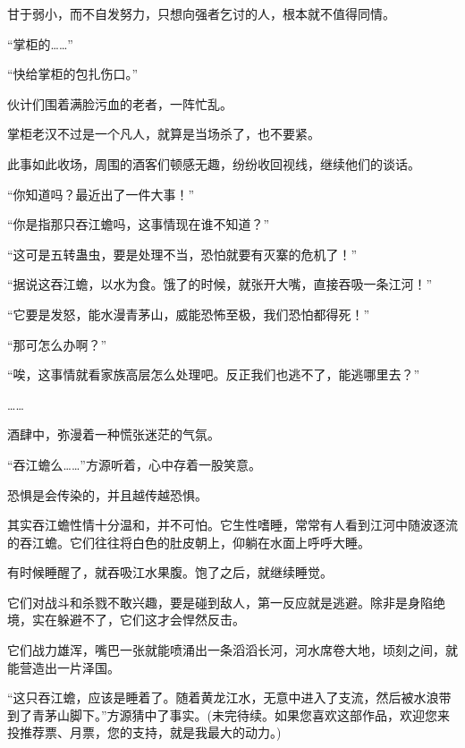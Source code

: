 \begin{this_body}
甘于弱小，而不自发努力，只想向强者乞讨的人，根本就不值得同情。

“掌柜的……”

“快给掌柜的包扎伤口。”

伙计们围着满脸污血的老者，一阵忙乱。

掌柜老汉不过是一个凡人，就算是当场杀了，也不要紧。

此事如此收场，周围的酒客们顿感无趣，纷纷收回视线，继续他们的谈话。

“你知道吗？最近出了一件大事！”

“你是指那只吞江蟾吗，这事情现在谁不知道？”

“这可是五转蛊虫，要是处理不当，恐怕就要有灭寨的危机了！”

“据说这吞江蟾，以水为食。饿了的时候，就张开大嘴，直接吞吸一条江河！”

“它要是发怒，能水漫青茅山，威能恐怖至极，我们恐怕都得死！”

“那可怎么办啊？”

“唉，这事情就看家族高层怎么处理吧。反正我们也逃不了，能逃哪里去？”

……

酒肆中，弥漫着一种慌张迷茫的气氛。

“吞江蟾么……”方源听着，心中存着一股笑意。

恐惧是会传染的，并且越传越恐惧。

其实吞江蟾性情十分温和，并不可怕。它生性嗜睡，常常有人看到江河中随波逐流的吞江蟾。它们往往将白色的肚皮朝上，仰躺在水面上呼呼大睡。

有时候睡醒了，就吞吸江水果腹。饱了之后，就继续睡觉。

它们对战斗和杀戮不敢兴趣，要是碰到敌人，第一反应就是逃避。除非是身陷绝境，实在躲避不了，它们这才会悍然反击。

它们战力雄浑，嘴巴一张就能喷涌出一条滔滔长河，河水席卷大地，顷刻之间，就能营造出一片泽国。

“这只吞江蟾，应该是睡着了。随着黄龙江水，无意中进入了支流，然后被水浪带到了青茅山脚下。”方源猜中了事实。(未完待续。如果您喜欢这部作品，欢迎您来投推荐票、月票，您的支持，就是我最大的动力。)

\end{this_body}

